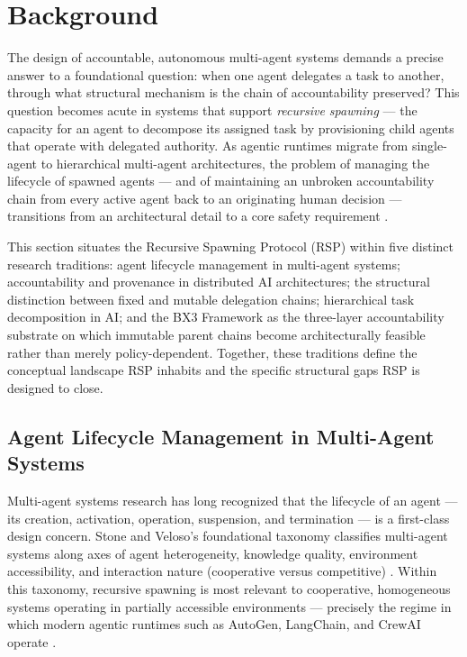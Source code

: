 \section{Background}
\label{sec:rs-background}

The design of accountable, autonomous multi-agent systems demands a precise answer to a foundational question: when one agent delegates a task to another, through what structural mechanism is the chain of accountability preserved? This question becomes acute in systems that support \emph{recursive spawning} — the capacity for an agent to decompose its assigned task by provisioning child agents that operate with delegated authority. As agentic runtimes migrate from single-agent to hierarchical multi-agent architectures, the problem of managing the lifecycle of spawned agents — and of maintaining an unbroken accountability chain from every active agent back to an originating human decision — transitions from an architectural detail to a core safety requirement \cite{stone2000,wooldridge1995}.

This section situates the Recursive Spawning Protocol (RSP) within five distinct research traditions: agent lifecycle management in multi-agent systems; accountability and provenance in distributed AI architectures; the structural distinction between fixed and mutable delegation chains; hierarchical task decomposition in AI; and the BX3 Framework as the three-layer accountability substrate on which immutable parent chains become architecturally feasible rather than merely policy-dependent. Together, these traditions define the conceptual landscape RSP inhabits and the specific structural gaps RSP is designed to close.

\subsection{Agent Lifecycle Management in Multi-Agent Systems}

Multi-agent systems research has long recognized that the lifecycle of an agent — its creation, activation, operation, suspension, and termination — is a first-class design concern. Stone and Veloso's foundational taxonomy classifies multi-agent systems along axes of agent heterogeneity, knowledge quality, environment accessibility, and interaction nature (cooperative versus competitive) \cite{stone2000}. Within this taxonomy, recursive spawning is most relevant to cooperative, homogeneous systems operating in partially accessible environments — precisely the regime in which modern agentic runtimes such as AutoGen, LangChain, and CrewAI operate \cite{autogen2023,langchain2023,crewai2024}.

